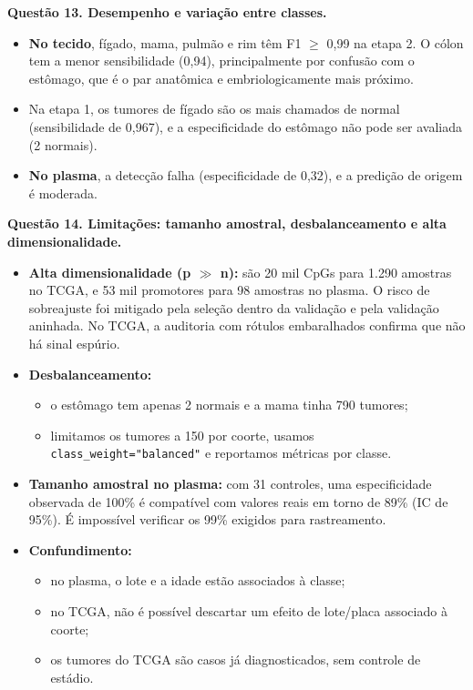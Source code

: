 \documentclass[11pt,a4paper]{article}
\providecommand{\tightlist}{\setlength{\itemsep}{0pt}\setlength{\parskip}{0pt}}
\begin{document}
\textbf{Questão 13. Desempenho e variação entre classes.}

\begin{itemize}
\tightlist
\item
  \textbf{No tecido}, fígado, mama, pulmão e rim têm F1 $\geq$ 0,99 na etapa 2. O
  cólon tem a menor sensibilidade (0,94), principalmente por confusão com o
  estômago, que é o par anatômica e embriologicamente mais próximo.
\item
  Na etapa 1, os tumores de fígado são os mais chamados de normal (sensibilidade
  de 0,967), e a especificidade do estômago não pode ser avaliada (2 normais).
\item
  \textbf{No plasma}, a detecção falha (especificidade de 0,32), e a predição de
  origem é moderada.
\end{itemize}

\textbf{Questão 14. Limitações: tamanho amostral, desbalanceamento e alta
dimensionalidade.}

\begin{itemize}
\tightlist
\item
  \textbf{Alta dimensionalidade (p $\gg$ n):} são 20 mil CpGs para 1.290 amostras no
  TCGA, e 53 mil promotores para 98 amostras no plasma. O risco de sobreajuste
  foi mitigado pela seleção dentro da validação e pela validação aninhada. No
  TCGA, a auditoria com rótulos embaralhados confirma que não há sinal espúrio.
\item
  \textbf{Desbalanceamento:}

  \begin{itemize}
  \tightlist
  \item
    o estômago tem apenas 2 normais e a mama tinha 790 tumores;
  \item
    limitamos os tumores a 150 por coorte, usamos
    \texttt{class\_weight="balanced"} e reportamos métricas por classe.
  \end{itemize}
\item
  \textbf{Tamanho amostral no plasma:} com 31 controles, uma especificidade
  observada de 100\% é compatível com valores reais em torno de 89\% (IC de
  95\%). É impossível verificar os 99\% exigidos para rastreamento.
\item
  \textbf{Confundimento:}

  \begin{itemize}
  \tightlist
  \item
    no plasma, o lote e a idade estão associados à classe;
  \item
    no TCGA, não é possível descartar um efeito de lote/placa associado à
    coorte;
  \item
    os tumores do TCGA são casos já diagnosticados, sem controle de estádio.
  \end{itemize}
\end{itemize}
\end{document}
